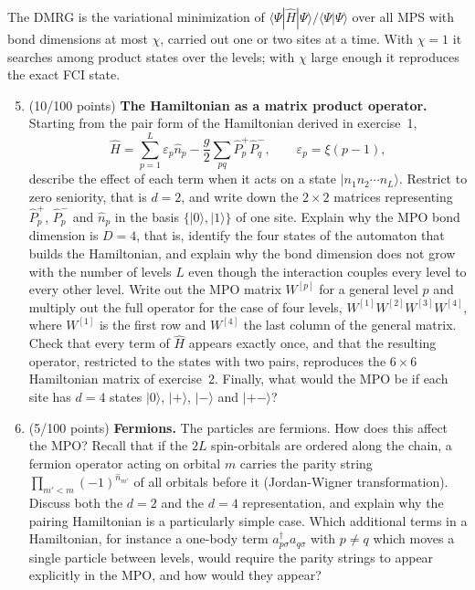\documentclass[prc]{revtex4} \usepackage[dvips]{graphicx}
\begin{document}
The DMRG is the variational minimization of
$\langle\Psi|\hat{H}|\Psi\rangle/\langle\Psi|\Psi\rangle$ over all MPS
with bond dimensions at most $\chi$, carried out one or two sites at a
time. With $\chi=1$ it searches among product states over the levels;
with $\chi$ large enough it reproduces the exact FCI state.

\begin{enumerate}
\setcounter{enumi}{4}

\item (10/100 points) \textbf{The Hamiltonian as a matrix product operator.}
Starting from the pair form of the Hamiltonian derived in exercise~1,
\[
\hat{H}=\sum_{p=1}^{L}\varepsilon_p\hat{n}_p
-\frac{g}{2}\sum_{pq}\hat{P}^+_p\hat{P}^-_q,
\qquad \varepsilon_p=\xi(p-1),
\]
describe the effect of each term when it acts on a state
$|n_1n_2\cdots n_L\rangle$. Restrict to zero seniority, that is $d=2$,
and write down the $2\times 2$ matrices representing $\hat{P}^+_p$,
$\hat{P}^-_p$ and $\hat{n}_p$ in the basis $\{|0\rangle,|1\rangle\}$ of
one site. Explain why the MPO bond dimension is $D=4$, that is,
identify the four states of the automaton that builds the
Hamiltonian, and explain why the bond dimension does not grow with the
number of levels $L$ even though the interaction couples every level to
every other level. Write out the MPO matrix $W^{[p]}$ for a general
level $p$ and multiply out the full operator for the case of four
levels, $W^{[1]}W^{[2]}W^{[3]}W^{[4]}$, where $W^{[1]}$ is the first row
and $W^{[4]}$ the last column of the general matrix. Check that every
term of $\hat{H}$ appears exactly once, and that the resulting
operator, restricted to the states with two pairs, reproduces the
$6\times 6$ Hamiltonian matrix of exercise~2. Finally, what would the
MPO be if each site has $d=4$ states $|0\rangle$, $|+\rangle$,
$|-\rangle$ and $|+-\rangle$?

\item (5/100 points) \textbf{Fermions.}
The particles are fermions. How does this affect the MPO? Recall that
if the $2L$ spin-orbitals are ordered along the chain, a fermion
operator acting on orbital $m$ carries the parity string
$\prod_{m'<m}(-1)^{\hat{n}_{m'}}$ of all orbitals before it
(Jordan-Wigner transformation). Discuss both the $d=2$ and the $d=4$
representation, and explain why the pairing Hamiltonian is a
particularly simple case. Which additional terms in a Hamiltonian,
for instance a one-body term
$a^\dagger_{p\sigma}a_{q\sigma}$ with $p\neq q$ which moves a single
particle between levels, would require the parity strings to appear
explicitly in the MPO, and how would they appear?


\end{enumerate}
\end{document}
